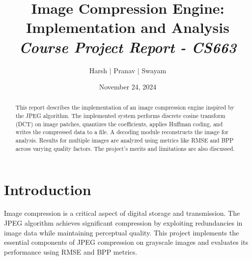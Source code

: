 \documentclass{article}
\title{Image Compression Engine: Implementation and Analysis\\ \large{\textit{Course Project Report - CS663}}}
\author{Harsh $\vert$ Pranav $\vert$ Swayam}
\date{November 24, 2024}
\begin{document}
\maketitle
\flushleft

\tableofcontents

\begin{abstract}
This report describes the implementation of an image compression engine inspired by the JPEG algorithm. The implemented system performs discrete cosine transform (DCT) on image patches, quantizes the coefficients, applies Huffman coding, and writes the compressed data to a file. A decoding module reconstructs the image for analysis. Results for multiple images are analyzed using metrics like RMSE and BPP across varying quality factors. The project's merits and limitations are also discussed.
\end{abstract}

\newpage
\section{Introduction}
Image compression is a critical aspect of digital storage and transmission. The JPEG algorithm achieves significant compression by exploiting redundancies in image data while maintaining perceptual quality. This project implements the essential components of JPEG compression on grayscale images and evaluates its performance using RMSE and BPP metrics.
\end{document}
